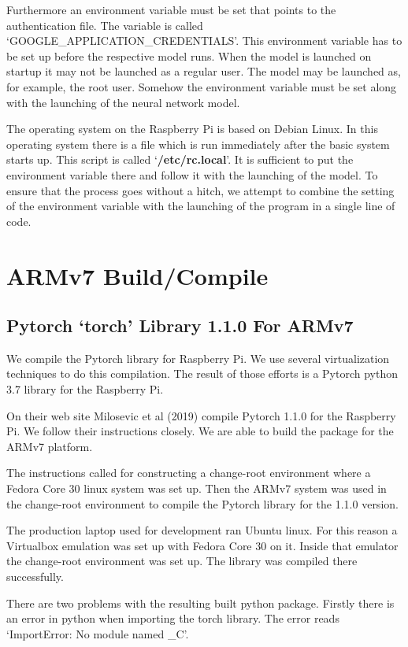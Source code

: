 Furthermore an environment variable must be set that points to the authentication file. The variable is called `GOOGLE\_APPLICATION\_CREDENTIALS'. This environment variable has to be set up before the respective model runs. When the model is launched on startup it may not be launched as a regular user. The model may be launched as, for example, the root user. Somehow the environment variable must be set along with the launching of the neural network model.

The operating system on the Raspberry Pi is based on Debian Linux. In this operating system there is a file which is run immediately after the basic system starts up. This script is called `\textbf{/etc/rc.local}'. It is sufficient to put the environment variable there and follow it with the launching of the model. To ensure that the process goes without a hitch, we attempt to combine the setting of the environment variable with the launching of the program in a single line of code.

\section{ARMv7 Build/Compile}

\subsection*{Pytorch `torch' Library 1.1.0 For ARMv7}
We compile the Pytorch library for Raspberry Pi. We use several virtualization techniques to do this compilation. The result of those efforts is a Pytorch python 3.7 library for the Raspberry Pi.

On their web site Milosevic et al (2019)\cite{2018Milosevic} compile Pytorch 1.1.0 for the Raspberry Pi. We follow their instructions closely. We are able to build the package for the ARMv7 platform.

The instructions called for constructing a change-root environment where a Fedora Core 30 linux system was set up. Then the ARMv7 system was used in the change-root environment to compile the Pytorch library for the 1.1.0 version.

The production laptop used for development ran Ubuntu linux. For this reason a Virtualbox emulation was set up with Fedora Core 30 on it. Inside that emulator the change-root environment was set up. The library was compiled there successfully. 

There are two problems with the resulting built python package. Firstly there is an error in python when importing the torch library. The error reads `ImportError: No module named \_C'. 

